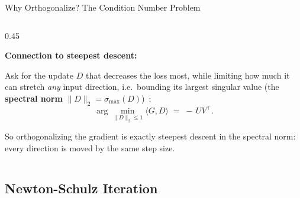\begin{frame}{Why Orthogonalize? The Condition Number Problem}
\begin{columns}[T]
\begin{column}{0.45\textwidth}
\begin{center}
      \end{center}

      \vspace{0.3em}
      \textbf{Connection to steepest descent:}

      Ask for the update $D$ that decreases the loss most, while limiting how much it can stretch \emph{any} input direction, i.e.\ bounding its largest singular value (the \textbf{spectral norm} $\|D\|_2 = \sigma_{\max}(D)$)~\cite{bernstein2024oldoptimizer}:
      \[
        \arg\min_{\|D\|_2 \leq 1} \langle G, D \rangle \;=\; -\,U V^\top.
      \]

      \vspace{0.2em}
      {\scriptsize So orthogonalizing the gradient is exactly steepest descent in the spectral norm: every direction is moved by the same step size.}
    \end{column}
  \end{columns}
\end{frame}

\subsection{Newton-Schulz Iteration}

